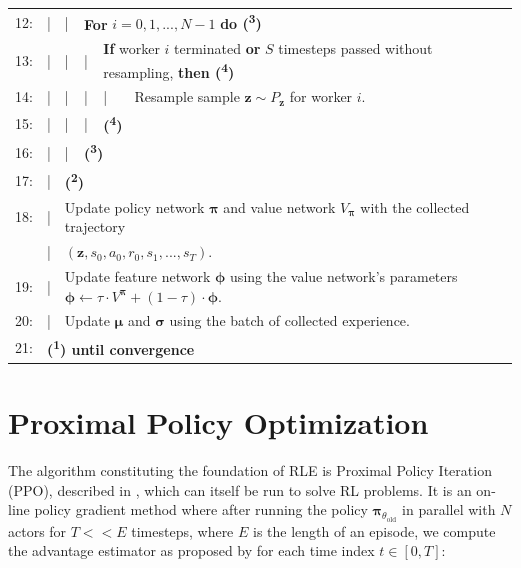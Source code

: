 \begin{table}[h!]
\begin{tabular}{rlllll}
    12: & | & | & \multicolumn{3}{l}{\textbf{For} $i = 0, 1, ..., N-1$ \textbf{do (\textsuperscript{3})}}\\
    13: & | & | & | & \multicolumn{2}{l}{\textbf{If} worker $i$ terminated \textbf{or} $S$ timesteps passed without resampling, \textbf{then (\textsuperscript{4})}}\\
    14: & | & | & | & | & Resample sample $\textbf{z} \sim P_{\textbf{z}}$ for worker $i$.\\
    15: & | & | & | & \multicolumn{2}{l}{\textbf{(\textsuperscript{4})}}\\
    16: & | & | & \multicolumn{3}{l}{\textbf{(\textsuperscript{3})}}\\
    17: & | & \multicolumn{4}{l}{\textbf{(\textsuperscript{2})}}\\
    18: & | & \multicolumn{4}{l}{Update policy network $\boldsymbol{\pi}$ and value network $V_{\boldsymbol{\pi}}$ with the collected trajectory}\\
    & | & \multicolumn{4}{l}{$(\textbf{z}, s_{0}, a_{0}, r_{0}, s_{1}, ..., s_{T})$.}\\
    19: & | & \multicolumn{4}{l}{Update feature network $\boldsymbol{\phi}$ using the value network's parameters $\boldsymbol{\phi} \leftarrow \tau \cdot V^{\boldsymbol{\pi}} + (1 - \tau) \cdot \boldsymbol{\phi}$.}\\
    20: & | & \multicolumn{4}{l}{Update $\boldsymbol{\mu}$ and $\boldsymbol{\sigma}$ using the batch of collected experience.}\\
    21: & \multicolumn{5}{l}{\textbf{(\textsuperscript{1}) until convergence}}\\
    \hline\hline
  \end{tabular}
\end{table}

\clearpage
\hypertarget{link-ppo}{\section{Proximal Policy Optimization}}

\noindent The algorithm constituting the foundation of \textsc{RLE} is Proximal Policy Iteration (\textsc{PPO}), described in \cite{ppo-paper}, which can itself be run to solve RL problems. It is an on-line policy gradient method where after running the policy $\boldsymbol{\pi}_{\theta_{\text{old}}}$ in parallel with $N$ actors for $T << E$ timesteps, where $E$ is the length of an episode, we compute the advantage estimator as proposed by \cite{generalized-advantage-estimation-paper} for each time index $t \in [0, T]$:

